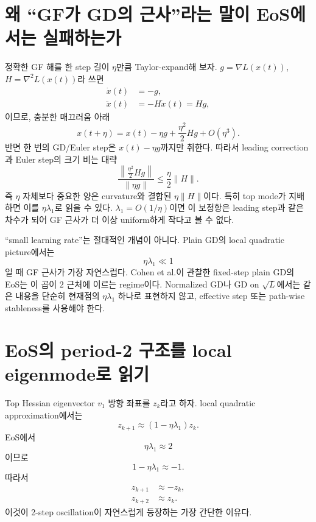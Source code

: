 \documentclass[11pt,a4paper,oneside,openany]{memoir}
\newcommand{\grad}{\nabla}
\newcommand{\Hess}{\nabla^2}
\theoremstyle{definition}
\begin{document}
\section{왜 ``GF가 GD의 근사''라는 말이 EoS에서는 실패하는가}

정확한 GF 해를 한 step 길이 $\eta$만큼 Taylor-expand해 보자. $g=\grad L(x(t))$, $H=\Hess L(x(t))$라 쓰면
\begin{align}
  \dot x(t)&=-g,\\
  \ddot x(t)&=-H\dot x(t)=Hg,
\end{align}
이므로, 충분한 매끄러움 아래
\begin{equation}
  x(t+\eta)
  =x(t)-\eta g+\frac{\eta^2}{2}Hg+O(\eta^3).
\end{equation}
반면 한 번의 GD/Euler step은 $x(t)-\eta g$까지만 취한다. 따라서 leading correction과 Euler step의 크기 비는 대략
\begin{equation}
  \frac{\left\|\frac{\eta^2}{2}Hg\right\|}{\|\eta g\|}
  \le \frac{\eta}{2}\|H\|.
\end{equation}
즉 $\eta$ 자체보다 중요한 양은 curvature와 결합된 $\eta\|H\|$이다. 특히 top mode가 지배하면 이를
$\eta\lambda_1$로 읽을 수 있다. $\lambda_1=O(1/\eta)$이면 이 보정항은 leading step과 같은 차수가 되어
GF 근사가 더 이상 uniform하게 작다고 볼 수 없다.

\begin{keybox}
``small learning rate''는 절대적인 개념이 아니다. Plain GD의 local quadratic picture에서는
\[
  \eta\lambda_1\ll1
\]
일 때 GF 근사가 가장 자연스럽다. Cohen et al.이 관찰한 fixed-step plain GD의 EoS는 이 곱이 $2$ 근처에 이르는 regime이다.
Normalized GD나 GD on $\sqrt L$에서는 같은 내용을 단순히 현재점의 $\eta\lambda_1$ 하나로 표현하지 않고,
effective step 또는 path-wise stableness를 사용해야 한다.
\end{keybox}

\section{EoS의 period-2 구조를 local eigenmode로 읽기}

Top Hessian eigenvector $v_1$ 방향 좌표를 $z_k$라고 하자. local quadratic approximation에서는
\begin{equation}
  z_{k+1}\approx(1-\eta\lambda_1)z_k.
\end{equation}
EoS에서
\begin{equation}
  \eta\lambda_1\approx2
\end{equation}
이므로
\begin{equation}
  1-\eta\lambda_1\approx-1.
\end{equation}
따라서
\begin{align}
  z_{k+1}&\approx-z_k,\\
  z_{k+2}&\approx z_k.
\end{align}
이것이 2-step oscillation이 자연스럽게 등장하는 가장 간단한 이유다.
\end{document}
